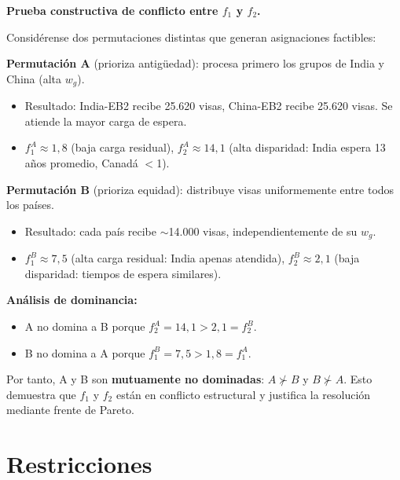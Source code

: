 \documentclass[12pt,letterpaper]{article}
\begin{document}
\begin{examplebox}
\textbf{Prueba constructiva de conflicto entre $f_1$ y $f_2$.}

Considérense dos permutaciones distintas que generan asignaciones factibles:

\textbf{Permutación A} (prioriza antigüedad): procesa primero los grupos de India y China (alta $w_g$).
\begin{itemize}
    \item Resultado: India-EB2 recibe 25.620 visas, China-EB2 recibe 25.620 visas. Se atiende la mayor carga de espera.
    \item $f_1^A \approx 1{,}8$ (baja carga residual), \; $f_2^A \approx 14{,}1$ (alta disparidad: India espera 13 años promedio, Canadá $<$1).
\end{itemize}

\textbf{Permutación B} (prioriza equidad): distribuye visas uniformemente entre todos los países.
\begin{itemize}
    \item Resultado: cada país recibe $\sim$14.000 visas, independientemente de su $w_g$.
    \item $f_1^B \approx 7{,}5$ (alta carga residual: India apenas atendida), \; $f_2^B \approx 2{,}1$ (baja disparidad: tiempos de espera similares).
\end{itemize}

\textbf{Análisis de dominancia:}
\begin{itemize}
    \item A no domina a B porque $f_2^A = 14{,}1 > 2{,}1 = f_2^B$.
    \item B no domina a A porque $f_1^B = 7{,}5 > 1{,}8 = f_1^A$.
\end{itemize}

Por tanto, A y B son \textbf{mutuamente no dominadas}: $A \nsucc B$ y $B \nsucc A$. Esto demuestra que $f_1$ y $f_2$ están en conflicto estructural y justifica la resolución mediante frente de Pareto. 
\end{examplebox}

\newpage
\section{Restricciones}
\end{document}
